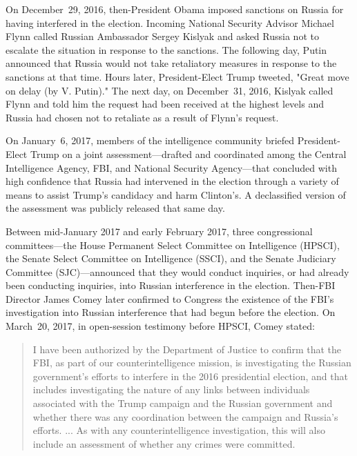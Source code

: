 On December~29, 2016, then-President Obama imposed sanctions on Russia for having interfered in the election.
Incoming National Security Advisor Michael Flynn called Russian Ambassador Sergey Kislyak and asked Russia not to escalate the situation in response to the sanctions.
The following day, Putin announced that Russia would not take retaliatory measures in response to the sanctions at that time.
Hours later, President-Elect Trump tweeted, "Great move on delay (by V. Putin)."
The next day, on December~31, 2016, Kislyak called Flynn and told him the request had been received at the highest levels and Russia had chosen not to retaliate as a result of Flynn's request.

\hr

On January~6, 2017, members of the intelligence community briefed President-Elect Trump on a joint assessment---drafted and coordinated among the Central Intelligence Agency, FBI, and National Security Agency---that concluded with high confidence that Russia had intervened in the election through a variety of means to assist Trump's candidacy and harm Clinton's.
A declassified version of the assessment was publicly released that same day.

Between mid-January 2017 and early February 2017, three congressional committees---the House Permanent Select Committee on Intelligence (HPSCI), the Senate Select Committee on Intelligence (SSCI), and the Senate Judiciary Committee (SJC)---announced that they would conduct inquiries, or had already been conducting inquiries, into Russian interference in the election.
Then-FBI Director James Comey later confirmed to Congress the existence of the FBI's investigation into Russian interference that had begun before the election.
On March~20, 2017, in open-session testimony before HPSCI, Comey stated:

\begin{quote}
I have been authorized by the Department of Justice to confirm that the FBI, as part of our counterintelligence mission, is investigating the Russian government's efforts to interfere in the 2016 presidential election, and that includes investigating the nature of any links between individuals associated with the Trump campaign and the Russian government and whether there was any coordination between the campaign and Russia's efforts.
...
As with any counterintelligence investigation, this will also include an assessment of whether any crimes were committed.
\end{quote}

